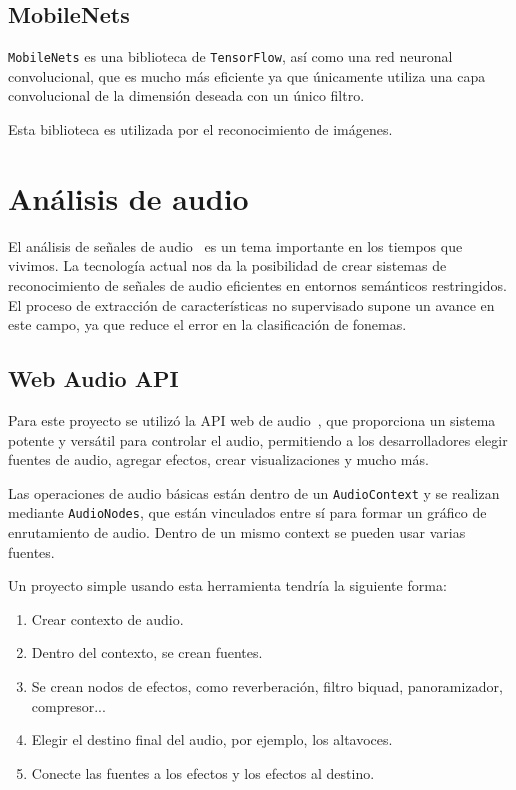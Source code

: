 \documentclass[a4paper, 12pt]{book}
\begin{document}
\subsection{MobileNets}
\label{subsec:mobilenets}

\texttt{MobileNets} es una biblioteca de \texttt{TensorFlow}, así como una red neuronal convolucional, que es mucho más eficiente ya que únicamente utiliza una capa convolucional de la dimensión deseada con un único filtro.

Esta biblioteca es utilizada por el reconocimiento de imágenes.

\section{Análisis de audio}
\label{sec:analisis-audio}

El análisis de señales de audio~\cite{gonzalez2019analisis} es un tema importante en los tiempos que vivimos. La tecnología actual nos da la posibilidad de crear sistemas de reconocimiento de señales de audio eficientes en entornos semánticos restringidos. El proceso de extracción de características no supervisado supone un avance en este campo, ya que reduce el error en la clasificación de fonemas.

\subsection{Web Audio API}
\label{subsec:audio-api}

Para este proyecto se utilizó la API web de audio~\cite{web-audio-api}, que proporciona un sistema potente y versátil para controlar el audio, permitiendo a los desarrolladores elegir fuentes de audio, agregar efectos, crear visualizaciones y mucho más.

Las operaciones de audio básicas están dentro de un \texttt{AudioContext} y se realizan mediante \texttt{AudioNodes}, que están vinculados entre sí para formar un gráfico de enrutamiento de audio. Dentro de un mismo context se pueden usar varias fuentes.

Un proyecto simple usando esta herramienta tendría la siguiente forma:

\begin{enumerate}
	\item Crear contexto de audio.
	\item Dentro del contexto, se crean fuentes.
	\item Se crean nodos de efectos, como reverberación, filtro biquad, panoramizador, compresor...
	\item Elegir el destino final del audio, por ejemplo, los altavoces.
	\item Conecte las fuentes a los efectos y los efectos al destino.
\end{enumerate}
\end{document}

